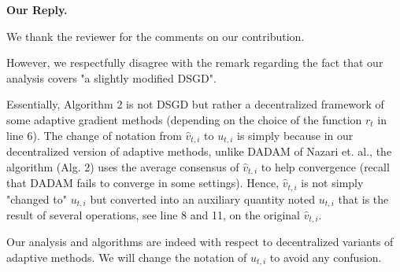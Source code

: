 \documentclass{article} %
\begin{document}
\textbf{Our Reply.}

We thank the reviewer for the comments on our contribution.

However, we respectfully disagree with the remark regarding the fact that our analysis covers "a slightly modified DSGD".

Essentially, Algorithm 2 is not DSGD but rather a decentralized framework of some adaptive gradient methods (depending on the choice of the function $r_t$ in line 6).
The change of notation from $\hat{v}_{t,i}$ to $u_{t,i}$ is simply because in our decentralized version of adaptive methods, unlike DADAM of Nazari et. al., the algorithm (Alg. 2) uses the average consensus of $\hat v_{t,i}$ to help convergence (recall that DADAM fails to converge in some settings).
Hence, $\hat{v}_{t,i}$ is not simply "changed to" $u_{t,i}$ but converted into an auxiliary quantity noted $u_{t,i}$ that is the result of several operations, see line 8 and 11, on the original $\hat{v}_{t,i}$.

Our analysis and algorithms are indeed with respect to decentralized variants of adaptive methods.
We will change the notation of $u_{t,i}$ to avoid any confusion.
\end{document}
